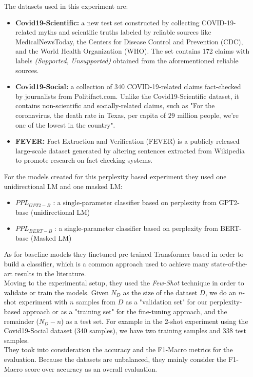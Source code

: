 \documentclass[10pt, english]{report}
\begin{document}
The datasets used in this experiment are:

\begin{itemize}
\item \textbf{Covid19-Scientific:} a new test set constructed by collecting COVID-19-related myths and scientific truths labeled by reliable sources like MedicalNewsToday, the Centers for Disease Control and Prevention (CDC), and the World Health Organization (WHO). The set contains 172 claims with labels \emph{(Supported, Unsupported)} obtained from the aforementioned reliable sources.
\item \textbf{Covid19-Social:} a collection of 340 COVID-19-related claims fact-checked by journalists from Politifact.com. Unlike the Covid19-Scientific dataset, it contains non-scientific and socially-related claims, such as "For the coronavirus, the death rate in Texas, per capita of 29 million people, we're one of the lowest in the country".
\item \textbf{FEVER:} Fact Extraction and Verification (FEVER) is a publicly released large-scale dataset generated by altering sentences extracted from Wikipedia to promote research on fact-checking systems.
\end{itemize}

For the models created for this perplexity based experiment they used one unidirectional LM and one masked LM:

\begin{itemize}
\item $PPL_{GPT2-B}$ : a single-parameter classifier based on perplexity from GPT2-base \cite{radford2019language} (unidirectional LM)
\item $PPL_{BERT-B}$ : a single-parameter classifier based on perplexity from BERT-base \cite{devlin2018bert} (Masked LM)
\end{itemize}

As for baseline models they finetuned pre-trained Transformer-based \cite{vaswani2017attention} in order to build a classifier, which is a common approach used to achieve many state-of-the-art results in the literature.\\

Moving to the experimental setup, they used the \textit{Few-Shot} technique in order to validate or train the models. Given $N_D$ as the size of the dataset $D$, we do an $n$-shot experiment with $n$ samples from $D$ as a "validation set" for our perplexity-based approach or as a "training set" for the fine-tuning approach, and the remainder ($N_D - n$) as a test set. For example in the 2-shot experiment using the Covid19-Social dataset (340 samples), we have two training samples and 338 test samples.\\
They took into consideration the accuracy and the F1-Macro metrics for the evaluation. Because the datasets are unbalanced, they mainly consider the F1-Macro score over accuracy as an overall evaluation.\\
\end{document}
